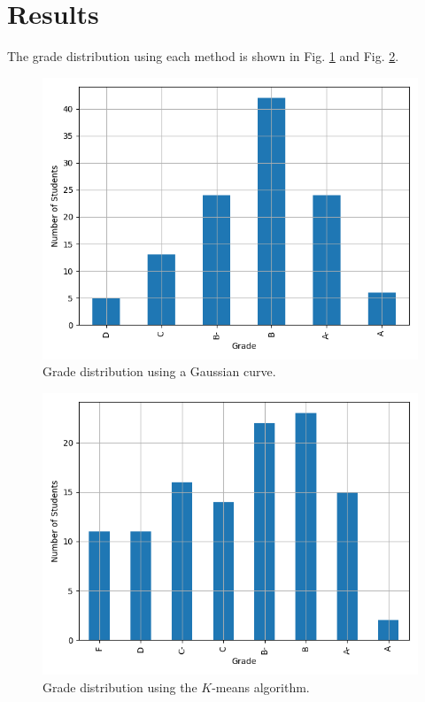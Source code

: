 \section{Results}
The grade distribution using each method is shown in Fig. \ref{fig:gauss-dist}
and Fig. \ref{fig:kmeans-dist}.
\begin{figure}[!ht]
    \centering
    \includegraphics[width=\columnwidth]{grading/figs/grades_gauss.png}
    \caption{Grade distribution using a Gaussian curve.}
    \label{fig:gauss-dist}
\end{figure}
\begin{figure}[!ht]
    \centering
    \includegraphics[width=\columnwidth]{grading/figs/grades_kmeans.png}
    \caption{Grade distribution using the $K$-means algorithm.}
    \label{fig:kmeans-dist}
\end{figure}
